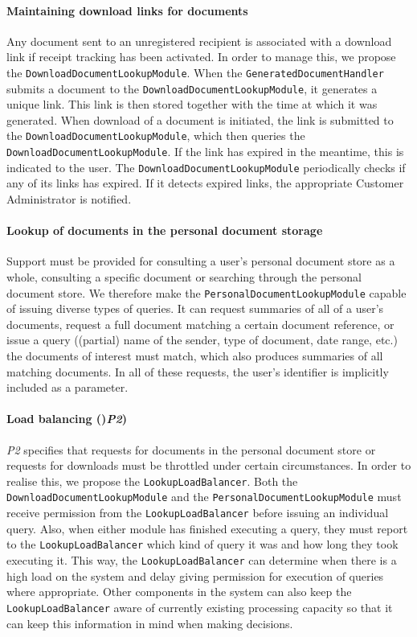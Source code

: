 \documentclass[a4paper,10pt]{article}
\begin{document}
\paragraph{Maintaining download links for documents}
Any document sent to an unregistered recipient is associated with a download link if receipt tracking has been activated. In order to manage this, we propose the \texttt{DownloadDocumentLookupModule}. When the \texttt{GeneratedDocumentHandler} submits a document to the \texttt{DownloadDocumentLookupModule}, it generates a unique link. This link is then stored together with the time at which it was generated. When download of a document is initiated, the link is submitted to the \texttt{DownloadDocumentLookupModule}, which then queries the \texttt{DownloadDocumentLookupModule}. If the link has expired in the meantime, this is indicated to the user. The \texttt{DownloadDocumentLookupModule} periodically checks if any of its links has expired. If it detects expired links, the appropriate Customer Administrator is notified.

\paragraph{Lookup of documents in the personal document storage}
Support must be provided for consulting a user's personal document store as a whole, consulting a specific document or searching through the personal document store. We therefore make the \texttt{PersonalDocumentLookupModule} capable of issuing diverse types of queries. It can request summaries of all of a user's documents, request a full document matching a certain document reference, or issue a query ((partial) name of the sender, type of document, date range, etc.) the documents of interest must match, which also produces summaries of all matching documents. In all of these requests, the user's identifier is implicitly included as a parameter.

\paragraph{Load balancing ()\emph{P2})}
\emph{P2} specifies that requests for documents in the personal document store or requests for downloads must be throttled under certain circumstances. In order to realise this, we propose the \texttt{LookupLoadBalancer}. Both the \texttt{DownloadDocumentLookupModule} and the \texttt{PersonalDocumentLookupModule} must receive permission from the \texttt{LookupLoadBalancer} before issuing an individual query. Also, when either module has finished executing a query, they must report to the \texttt{LookupLoadBalancer} which kind of query it was and how long they took executing it. This way, the \texttt{LookupLoadBalancer} can determine when there is a high load on the system and delay giving permission for execution of queries where appropriate. Other components in the system can also keep the \texttt{LookupLoadBalancer} aware of currently existing processing capacity so that it can keep this information in mind when making decisions.
\end{document}

